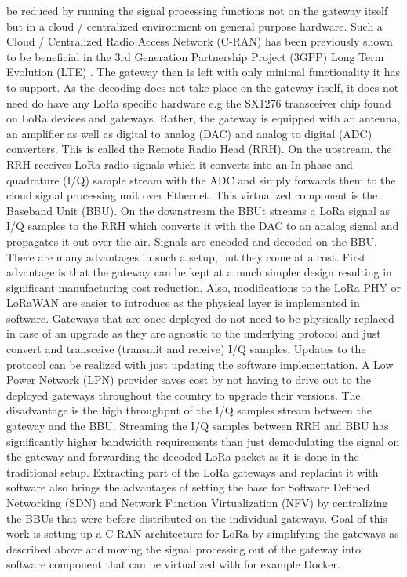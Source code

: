 be reduced by running the signal processing functions not on the gateway itself but in a cloud / centralized environment on general purpose hardware. Such a Cloud / Centralized Radio
Access Network (C-RAN) has been previously shown to be beneficial in the 3rd Generation Partnership
Project (3GPP) Long Term Evolution (LTE) \cite{Sousa2016}. The gateway then is left with only minimal functionality it has to support.
As the decoding does not take place on the gateway itself, it does not need do have any LoRa specific hardware e.g the SX1276 transceiver chip
found on LoRa devices and gateways. Rather, the gateway is equipped with an antenna, an amplifier as well as digital to analog (DAC) and 
analog to digital (ADC) converters. This is called the Remote Radio Head (RRH). On the upstream, the RRH receives LoRa radio signals which it converts into an In-phase and quadrature 
(I/Q) sample stream with the ADC and simply forwards them to the cloud signal processing unit over Ethernet.  This virtualized component is the Baseband Unit (BBU).
On the downstream the BBUt streams a LoRa signal as I/Q samples to the RRH which converts it with the DAC to an analog signal and 
propagates it out over the air. Signals are encoded and decoded on the BBU. There are many advantages in such 
a setup, but they come at a cost. First advantage is that the gateway can be kept at a much simpler design resulting in significant manufacturing
cost reduction. Also, modifications to the LoRa PHY or LoRaWAN are easier to introduce as the physical layer is implemented in software. 
Gateways that are once deployed do not need to be physically replaced in case of an upgrade as they are agnostic to the underlying protocol and
just convert and transceive (transmit and receive) I/Q samples. Updates to the protocol can be realized with just updating the software implementation. 
A Low Power Network (LPN) provider saves cost by not having to drive out to the deployed gateways throughout the country to upgrade their versions.
The disadvantage is the high throughput of the I/Q samples stream between the gateway and the BBU. Streaming the I/Q samples between RRH and BBU 
has significantly higher bandwidth requirements than just demodulating the signal on the gateway and forwarding the decoded LoRa packet as it is done 
in the traditional setup. Extracting part of the LoRa gateways and replacint it with software also brings the advantages of setting the base for Software Defined Networking (SDN) and 
Network Function Virtualization (NFV) by centralizing the BBUs that were before distributed on the individual gateways.
Goal of this work is setting up a C-RAN architecture for LoRa by simplifying the gateways as described above and moving the signal processing out of the 
gateway into software component that can be virtualized with for example Docker.





